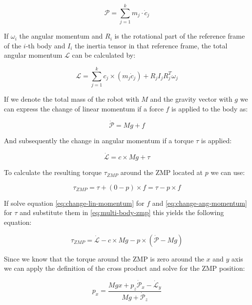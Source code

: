 \documentclass[english,ngerman]{KITreprt}
\begin{document}
\begin{equation}
\mathcal{P} = \sum^k_{j=1} m_j \cdot \dot{c}_j
\end{equation}

If $\omega_i$ the angular momentum and $R_i$ is the rotational part of
the reference frame of the $i$-th body and $I_i$ the inertia tensor in
that reference frame, the total angular momentum $\mathcal{L}$ can be
calculated by:

\begin{equation}
\mathcal{L} = \sum^k_{j=1} c_j \times (m_j \dot{c}_j) + R_j I_j R^T_j \omega_j
\end{equation}

If we denote the total mass of the robot with $M$ and the gravity vector
with $g$ we can express the change of linear momentum if a force $f$ is
applied to the body as:

\begin{equation} \label{eq:change-lin-momentum}
\dot{\mathcal{P}} = M g + f
\end{equation}

And subsequently the change in angular momentum if a torque $\tau$ is
applied:

\begin{equation} \label{eq:change-ang-momentum}
\dot{\mathcal{L}} = c \times Mg + \tau
\end{equation}

To calculate the resulting torque $\tau_{ZMP}$ around the ZMP located at
$p$ we can use:

\begin{equation} \label{eq:multi-body-zmp}
\tau_{ZMP} = \tau + (0 - p) \times f = \tau - p \times f
\end{equation}

If solve equation \ref{eq:change-lin-momentum} for $f$ and
\ref{eq:change-ang-momentum} for $\tau$ and substitute them in
\ref{eq:multi-body-zmp} this yields the following equation:

\begin{equation}
\tau_{ZMP} = \dot{\mathcal{L}} - c \times M g - p \times (\dot{\mathcal{P}} - Mg)
\end{equation}

Since we know that the torque around the ZMP is zero around the $x$ and
$y$ axis we can apply the definition of the cross product and solve for
the ZMP position:

\begin{equation}
p_x = \frac{Mgx + p_z \dot{\mathcal{P}}_x - \dot{\mathcal{L}}_y}{Mg + \dot{\mathcal{P}}_z}
\end{equation}
\end{document}
